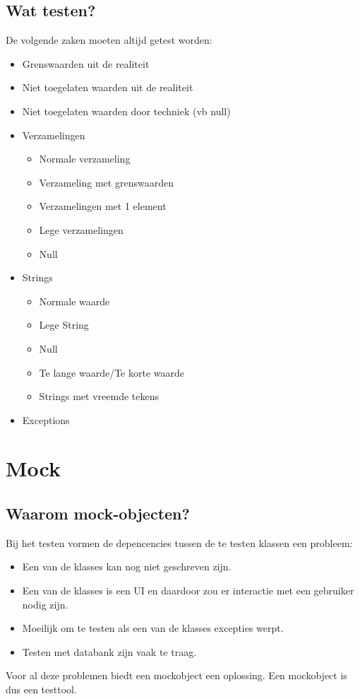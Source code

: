 \documentclass[11pt,a4paper]{article}
\begin{document}
\subsection{Wat testen?}
De volgende zaken moeten altijd getest worden:
\begin{itemize}
	\item Grenswaarden uit de realiteit
	\item Niet toegelaten waarden uit de realiteit
	\item Niet toegelaten waarden door techniek (vb null)
	\item Verzamelingen
	\begin{itemize}
		\item Normale verzameling
		\item Verzameling met grenswaarden
		\item Verzamelingen met 1 element
		\item Lege verzamelingen
		\item Null
	\end{itemize}	
	\item Strings
	\begin{itemize}
		\item Normale waarde
		\item Lege String
		\item Null
		\item Te lange waarde/Te korte waarde
		\item Strings met vreemde tekens
	\end{itemize}	
	\item Exceptions

\end{itemize}
\section{Mock}
\subsection{Waarom mock-objecten?}
Bij het testen vormen de depencencies tussen de te testen klassen een probleem:
\begin{itemize}
	\item Een van de klasses kan nog niet geschreven zijn.
	\item Een van de klasses is een UI en daardoor zou er 			interactie met een gebruiker nodig zijn.
	\item Moeilijk om te testen als een van de klasses excepties werpt.
	\item Testen met databank zijn vaak te traag.
\end{itemize}
Voor al deze problemen biedt een mockobject een oplossing. Een mockobject is dus een testtool.
\end{document}
